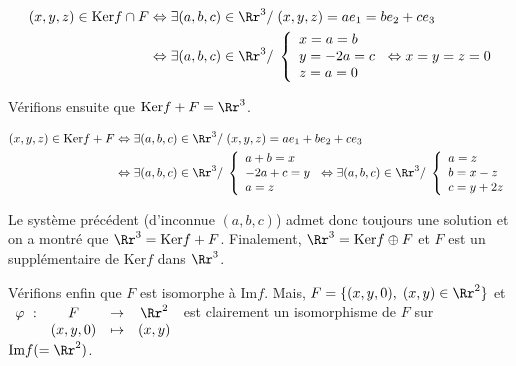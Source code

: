 {\begin{enumerate}
{\begin{align*}
(x,y,z)\in\mbox{Ker}f\cap F&\Leftrightarrow\exists(a,b,c)\in\Rr^3/\;(x,y,z)=ae_1=be_2+ce_3\\
 &\Leftrightarrow\exists(a,b,c)\in\Rr^3/\;
\left\{
\begin{array}{l}
x=a=b\\
y=-2a=c\\
z=a=0
\end{array}
\right.
\Leftrightarrow x=y=z=0
\end{align*}

Vérifions ensuite que $\mbox{Ker}f+F=\Rr^3$.

\begin{align*}
(x,y,z)\in\mbox{Ker}f+F&\Leftrightarrow\exists(a,b,c)\in\Rr^3/\;(x,y,z)=ae_1+be_2+ce_3\\
 &\Leftrightarrow\exists(a,b,c)\in\Rr^3/\;
\left\{
\begin{array}{l}
a+b=x\\
-2a+c=y\\
a=z
\end{array}
\right.
\Leftrightarrow
\exists(a,b,c)\in\Rr^3/\;\left\{
\begin{array}{l}
a=z\\
b=x-z\\
c=y+2z
\end{array}
\right.
\end{align*}

Le système précédent (d'inconnue $(a,b,c)$) admet donc toujours une solution et on a montré que $\Rr^3=\mbox{Ker}f+F$.
Finalement, $\Rr^3=\mbox{Ker}f\oplus F$ et $F$ est un supplémentaire de $\mbox{Ker}f$ dans $\Rr^3$.

Vérifions enfin que $F$ est isomorphe à $\mbox{Im}f$. Mais, $F=\{(x,y,0),\;(x,y)\in\Rr^2\}$ et
$\begin{array}[t]{cccc}
\varphi~:&F&\rightarrow&\Rr^2\\
 &(x,y,0)&\mapsto&(x,y)
\end{array}$ est clairement un isomorphisme de $F$ sur $\mbox{Im}f(=\Rr^2)$.}
\end{enumerate}
}
